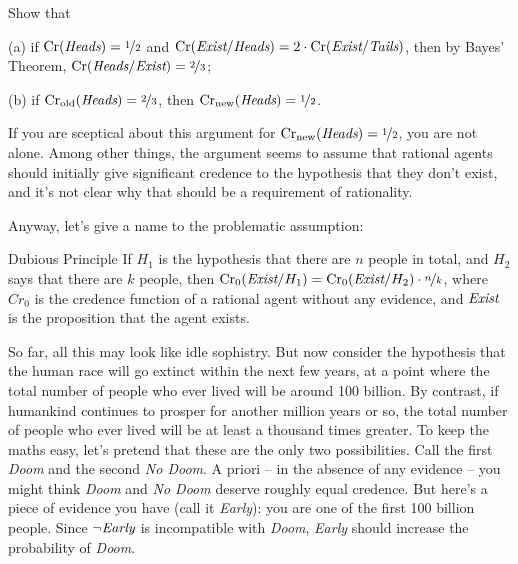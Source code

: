 \begin{exercise}
  Show that
  \begin{enumerate*}
  \item[(a)] if $\text{Cr}(\emph{Heads}) = \nicefrac{1}{2}$ and
    $\text{Cr}(\emph{Exist}/\emph{Heads}) = 2 \cdot
    \text{Cr}(\emph{Exist}/\emph{Tails})$, then by Bayes' Theorem,
    $\text{Cr}(\emph{Heads}/\emph{Exist}) = \nicefrac{2}{3}$;
  \item[(b)] if $\text{Cr}_\text{old}(\emph{Heads}) = \nicefrac{2}{3}$, then
    $\text{Cr}_\text{new}(\emph{Heads}) = \nicefrac{1}{2}$.
  \end{enumerate*}
  \vspace{-4mm}
\end{exercise}

If you are sceptical about this argument for $\text{Cr$_{\text{new}}$}(\emph{Heads}) =
\nicefrac{1}{2}$, you are not alone. Among other things, the argument seems to
assume that rational agents should initially give significant credence
to the hypothesis that they don't exist, and it's not clear why that
should be a requirement of rationality.

Anyway, let's give a name to the problematic assumption:
\begin{genericthm}{Dubious Principle}
  If $H_1$ is the hypothesis that there are $n$ people in total, and
  $H_2$ says that there are $k$ people, then $\text{Cr}_0(\emph{Exist} /
  H_1) = \text{Cr}_0(\emph{Exist}/H_2) \cdot \nicefrac{n}{k}$, where $Cr_0$
  is the credence function of a rational agent without any evidence,
  and $\emph{Exist}$ is the proposition that the agent exists.
\end{genericthm}

So far, all this may look like idle sophistry. But now consider the
hypothesis that the human race will go extinct within the next few
years, at a point where the total number of people who ever lived will
be around 100 billion. By contrast, if humankind continues to prosper
for another million years or so, the total number of people who ever
lived will be at least a thousand times greater. To keep the maths
easy, let's pretend that these are the only two possibilities. Call
the first \emph{Doom} and the second \emph{No Doom}. A priori -- in
the absence of any evidence -- you might think \emph{Doom} and
\emph{No Doom} deserve roughly equal credence. But here's a piece of
evidence you have (call it \emph{Early}): you are one of the first 100 billion
people. Since $\neg \emph{Early}$ is incompatible with \emph{Doom}, \emph{Early} should increase the probability of
\emph{Doom}. 

